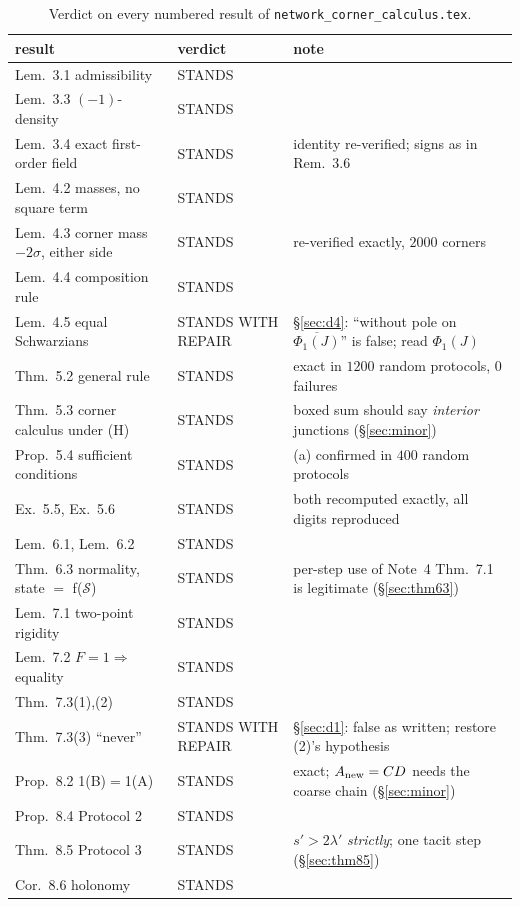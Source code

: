 \documentclass[11pt]{article}
\newcommand{\Sch}{\mathcal S}
\newcommand{\doc}{\texttt{network\_corner\_calculus.tex}}
\theoremstyle{definition}\newtheorem{example}[theorem]{Example}
\begin{document}
\begin{table}[h]\centering\small
\caption{Verdict on every numbered result of \doc.}
\label{tab:verdicts}
\begin{tabular}{@{}llp{7.4cm}@{}}
\toprule
result & verdict & note\\
\midrule
Lem.~3.1 admissibility & STANDS & \\
Lem.~3.3 $(-1)$-density & STANDS & \\
Lem.~3.4 exact first-order field & STANDS & identity re-verified; signs as in Rem.~3.6\\
Lem.~4.2 masses, no square term & STANDS & \\
Lem.~4.3 corner mass $-2\sigma$, either side & STANDS & re-verified exactly, $2000$ corners\\
Lem.~4.4 composition rule & STANDS & \\
Lem.~4.5 equal Schwarzians & STANDS WITH REPAIR & \S\ref{sec:d4}: ``without pole on
 $\overline{\Phi_1(J)}$'' is false; read $\Phi_1(J)$\\
Thm.~5.2 general rule & STANDS & exact in $1200$ random protocols, $0$ failures\\
Thm.~5.3 corner calculus under (H) & STANDS & boxed sum should say \emph{interior}
 junctions (\S\ref{sec:minor})\\
Prop.~5.4 sufficient conditions & STANDS & (a) confirmed in $400$ random protocols\\
Ex.~5.5, Ex.~5.6 & STANDS & both recomputed exactly, all digits reproduced\\
Lem.~6.1, Lem.~6.2 & STANDS & \\
Thm.~6.3 normality, state $=$ f($\Sch$) & STANDS & per-step use of Note~4 Thm.~7.1 is
 legitimate (\S\ref{sec:thm63})\\
Lem.~7.1 two-point rigidity & STANDS & \\
Lem.~7.2 $F=1\Rightarrow$ equality & STANDS & \\
Thm.~7.3(1),(2) & STANDS & \\
Thm.~7.3(3) ``never'' & STANDS WITH REPAIR & \S\ref{sec:d1}: false as written; restore
 (2)'s hypothesis\\
Prop.~8.2 1(B)$=$1(A) & STANDS & exact; $A_{\rm new}=CD$ needs the coarse chain
 (\S\ref{sec:minor})\\
Prop.~8.4 Protocol 2 & STANDS & \\
Thm.~8.5 Protocol 3 & STANDS & $s'>2\lambda'$ \emph{strictly}; one tacit step
 (\S\ref{sec:thm85})\\
Cor.~8.6 holonomy & STANDS & \\

\end{tabular}
\end{table}
\end{document}
